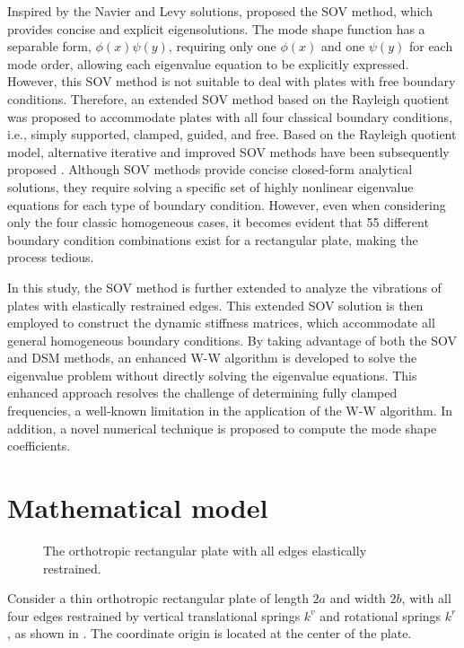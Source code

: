 \documentclass[preprint,12pt]{elsarticle}
\begin{document}
Inspired by the Navier and Levy solutions, \citet{xing2009new} proposed the SOV method, which provides concise and explicit eigensolutions.
The mode shape function has a separable form, $\phi(x) \psi(y)$, requiring only one $\phi(x)$ and one $\psi(y)$ for each mode order, allowing each eigenvalue equation to be explicitly expressed.
However, this SOV method is not suitable to deal with plates with free boundary conditions.
Therefore, an extended SOV method \cite{xing2018overall, xing2020extended} based on the Rayleigh quotient was proposed to accommodate plates with all four classical boundary conditions, i.e., simply supported, clamped, guided, and free.
Based on the Rayleigh quotient model, alternative iterative and improved SOV methods have been subsequently proposed \cite{xing2020improved}.
Although SOV methods provide concise closed-form analytical solutions, they require solving a specific set of highly nonlinear eigenvalue equations for each type of boundary condition.
However, even when considering only the four classic homogeneous cases, it becomes evident that 55 different boundary condition combinations exist for a rectangular plate, making the process tedious.

In this study, the SOV method is further extended to analyze the vibrations of plates with elastically restrained edges.
This extended SOV solution is then employed to construct the dynamic stiffness matrices, which accommodate all general homogeneous boundary conditions.
By taking advantage of both the SOV and DSM methods, an enhanced W-W algorithm is developed to solve the eigenvalue problem without directly solving the eigenvalue equations.
This enhanced approach resolves the challenge of determining fully clamped frequencies, a well-known limitation in the application of the  W-W algorithm.
In addition, a novel numerical technique is proposed to compute the mode shape coefficients.


\FloatBarrier
\section{Mathematical model}\label{sec:Mathematical model}
\begin{figure}[!htbp]
	\centering
	\resizebox{0.8\textwidth}{!}
	{
		
	}
	\caption{\small The orthotropic rectangular plate with all edges elastically restrained.} 
	\label{fig:platemode}
\end{figure}
Consider a thin orthotropic rectangular plate of length $2a$ and width $2b$, with all four edges restrained by vertical translational springs $k^v$ and rotational springs $k^r$, as shown in . 
The coordinate origin is located at the center of the plate.
\end{document}
